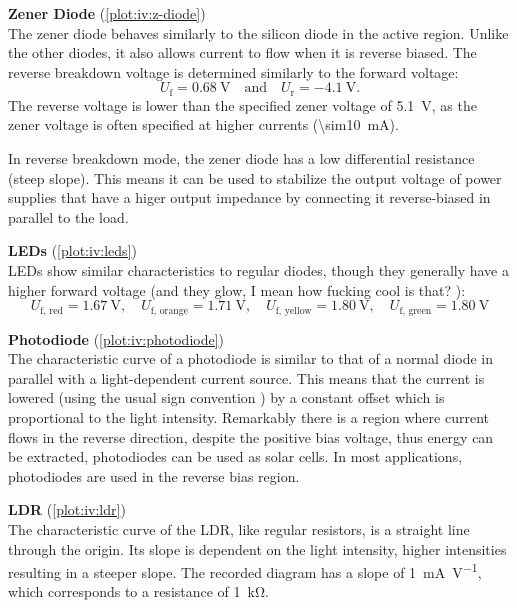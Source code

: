 \textbf{Zener Diode} (\autoref{plot:iv:z-diode})\\
The zener diode behaves similarly to the silicon diode in the active region.
Unlike the other diodes, it also allows current to flow when it is reverse biased.
The reverse breakdown voltage is determined similarly to the forward voltage:
\begin{equation*}
	U_\text{f} = \SI{0.68}{\volt} \quad \text{and} \quad U_\text{r} = \SI{-4.1}{\volt}.
\end{equation*}
The reverse voltage is lower than the specified zener voltage of \SI{5.1}{\volt}, as the zener voltage is often specified at higher currents (\SI{\sim10}{\mA}).

In reverse breakdown mode, the zener diode has a low differential resistance (steep slope).
This means it can be used to stabilize the output voltage of power supplies that have a higer output impedance by connecting it reverse-biased in parallel to the load.

\textbf{LEDs} (\autoref{plot:iv:leds})\\
LEDs show similar characteristics to regular diodes, though they generally have a higher forward voltage (and they glow, I mean how fucking cool is that? ):
\begin{equation*}
	U_\text{f, red} = \SI{1.67}{\volt}, \quad U_\text{f, orange} = \SI{1.71}{\volt}, \quad U_\text{f, yellow} = \SI{1.80}{\volt}, \quad U_\text{f, green} = \SI{1.80}{\volt}
\end{equation*}

\textbf{Photodiode} (\autoref{plot:iv:photodiode})\\
The characteristic curve of a photodiode is similar to that of a normal diode in parallel with a light-dependent current source.
This means that the current is lowered (using the usual sign convention ) by a constant offset which is proportional to the light intensity.
Remarkably there is a region where current flows in the reverse direction, despite the positive bias voltage, thus energy can be extracted, photodiodes can be used as solar cells.
In most applications, photodiodes are used in the reverse bias region.

\textbf{LDR} (\autoref{plot:iv:ldr})\\
The characteristic curve of the LDR, like regular resistors, is a straight line through the origin.
Its slope is dependent on the light intensity, higher intensities resulting in a steeper slope.
The recorded diagram has a slope of \SI{1}{\mA\per\volt}, which corresponds to a resistance of \SI{1}{\kilo\ohm}.

